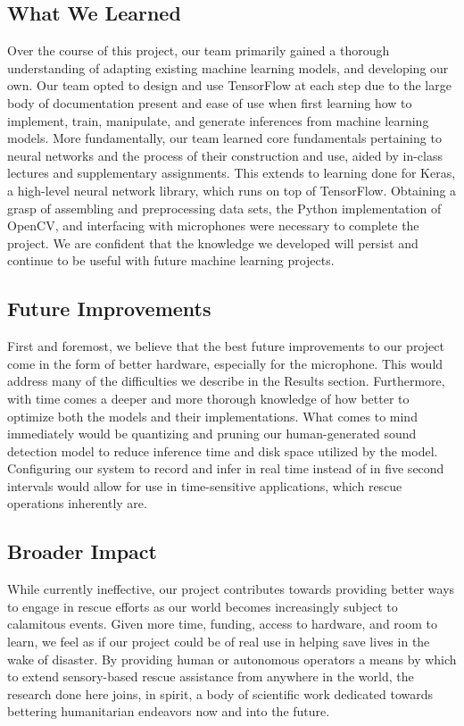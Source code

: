 \documentclass{article}
\begin{document}
\subsection{What We Learned}
Over the course of this project, our team primarily gained a thorough understanding of adapting existing machine learning models, and developing our own. Our team opted to design and use TensorFlow at each step due to the large body of documentation present and ease of use when first learning how to implement, train, manipulate, and generate inferences from machine learning models. More fundamentally, our team learned core fundamentals pertaining to neural networks and the process of their construction and use, aided by in-class lectures and supplementary assignments. This extends to learning done for Keras, a high-level neural network library, which runs on top of TensorFlow.
Obtaining a grasp of assembling and preprocessing data sets, the Python implementation of OpenCV, and interfacing with microphones were necessary to complete the project. We are confident that the knowledge we developed will persist and continue to be useful with future machine learning projects.
\subsection{Future Improvements}
First and foremost, we believe that the best future improvements to our project come in the form of better hardware, especially for the microphone. This would address many of the difficulties we describe in the Results section. Furthermore, with time comes a deeper and more thorough knowledge of how better to optimize both the models and their implementations. What comes to mind immediately would be quantizing and pruning our human-generated sound detection model to reduce inference time and disk space utilized by the model. Configuring our system to record and infer in real time instead of in five second intervals would allow for use in time-sensitive applications, which rescue operations inherently are.
\subsection{Broader Impact}
While currently ineffective, our project contributes towards providing better ways to engage in rescue efforts as our world becomes increasingly subject to calamitous events. Given more time, funding, access to hardware, and room to learn, we feel as if our project could be of real use in helping save lives in the wake of disaster. By providing human or autonomous operators a means by which to extend sensory-based rescue assistance from anywhere in the world, the research done here joins, in spirit, a body of scientific work dedicated towards bettering humanitarian endeavors now and into the future.
\end{document}
